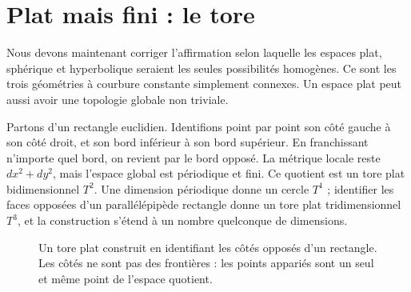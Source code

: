 \begin{classroomqa}
\end{classroomqa}

\section{Plat mais fini : le tore}

Nous devons maintenant corriger l’affirmation selon laquelle les espaces plat, sphérique et hyperbolique seraient les seules possibilités homogènes. Ce sont les trois géométries à courbure constante simplement connexes. Un espace plat peut aussi avoir une topologie globale non triviale.

Partons d’un rectangle euclidien. Identifions point par point son côté gauche à son côté droit, et son bord inférieur à son bord supérieur. En franchissant n’importe quel bord, on revient par le bord opposé. La métrique locale reste \(dx^2+dy^2\), mais l’espace global est périodique et fini. Ce quotient est un tore plat bidimensionnel \(T^2\). Une dimension périodique donne un cercle \(T^1\) ; identifier les faces opposées d’un parallélépipède rectangle donne un tore plat tridimensionnel \(T^3\), et la construction s’étend à un nombre quelconque de dimensions.

\begin{figure}[htbp]
\centering
{}
\caption{Un tore plat construit en identifiant les côtés opposés d’un rectangle. Les côtés ne sont pas des frontières : les points appariés sont un seul et même point de l’espace quotient.}
\label{fig:c03-flat-torus}
\end{figure}

